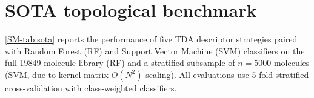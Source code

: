 \documentclass[11pt,a4paper]{article}
\begin{document}

\section{SOTA topological benchmark}
\label{SM-sec:sota_benchmark}

\cref{SM-tab:sota} reports the performance of five TDA descriptor strategies paired with Random Forest (RF) and Support Vector Machine (SVM) classifiers on the full \num{19849}-molecule library (RF) and a stratified subsample of $n = 5000$ molecules (SVM, due to kernel matrix $O(N^2)$ scaling). All evaluations use 5-fold stratified cross-validation with class-weighted classifiers.
\end{document}
